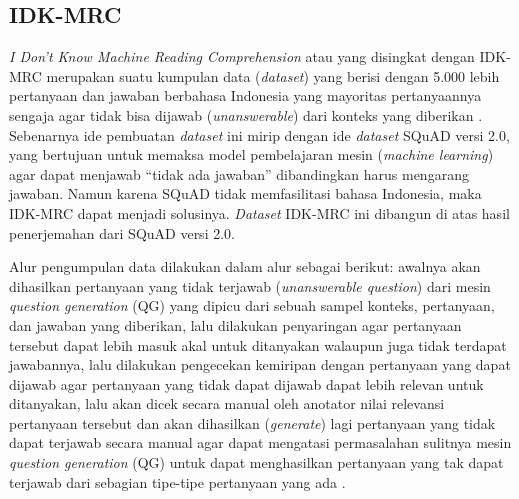 \subsection{IDK-MRC}
\label{2.2.3}
\emph{I Don’t Know Machine Reading Comprehension} atau yang disingkat dengan IDK-MRC merupakan suatu kumpulan data (\emph{dataset}) yang berisi dengan 5.000 lebih pertanyaan dan jawaban berbahasa Indonesia yang mayoritas pertanyaannya sengaja agar tidak bisa dijawab (\emph{unanswerable}) dari konteks yang diberikan \citep{putri-oh-2022-idk}. Sebenarnya ide pembuatan \emph{dataset} ini mirip dengan ide \emph{dataset} SQuAD versi 2.0, yang bertujuan untuk memaksa model pembelajaran mesin (\emph{machine learning}) agar dapat menjawab “tidak ada jawaban” dibandingkan harus mengarang jawaban. Namun karena SQuAD tidak memfasilitasi bahasa Indonesia, maka IDK-MRC dapat menjadi solusinya. \emph{Dataset} IDK-MRC ini dibangun di atas hasil penerjemahan dari SQuAD versi 2.0.

Alur pengumpulan data dilakukan dalam alur sebagai berikut: awalnya akan dihasilkan pertanyaan yang tidak terjawab (\emph{unanswerable question}) dari mesin \emph{question generation} (QG) yang dipicu dari sebuah sampel konteks, pertanyaan, dan jawaban yang diberikan, lalu dilakukan penyaringan agar pertanyaan tersebut dapat lebih masuk akal untuk ditanyakan walaupun juga tidak terdapat jawabannya, lalu dilakukan pengecekan kemiripan dengan pertanyaan yang dapat dijawab agar pertanyaan yang tidak dapat dijawab dapat lebih relevan untuk ditanyakan, lalu akan dicek secara manual oleh anotator nilai relevansi pertanyaan tersebut dan akan dihasilkan (\emph{generate}) lagi pertanyaan yang tidak dapat terjawab secara manual agar dapat mengatasi permasalahan sulitnya mesin \emph{question generation} (QG) untuk dapat menghasilkan pertanyaan yang tak dapat terjawab dari sebagian tipe-tipe pertanyaan yang ada \citep{putri-oh-2022-idk}.

